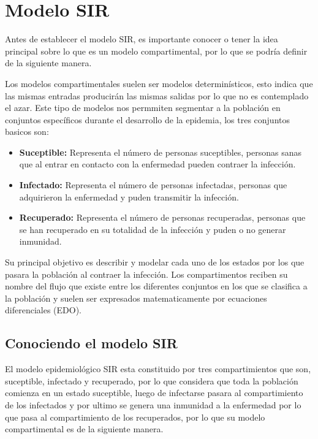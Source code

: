 \documentclass[a4paper,openany,12pt]{book}
\begin{document}
\chapter{Modelo SIR}

Antes de establecer el modelo SIR, es importante conocer o tener la idea principal sobre lo que es un modelo compartimental, por lo que se podría definir de la siguiente manera.

Los modelos compartimentales suelen ser modelos determinísticos, esto indica que las mismas entradas producirán las mismas salidas por lo que no es contemplado el azar. Este tipo de modelos nos permmiten segmentar a la población en conjuntos específicos durante el desarrollo de la epidemia, los tres conjuntos basicos son:

\begin{itemize}
\item \textbf{Suceptible:} Representa el número de personas suceptibles, personas sanas que al entrar en contacto con la enfermedad pueden contraer la infección.

\item \textbf{Infectado:} Representa el número de personas infectadas, personas que adquirieron la enfermedad y puden transmitir la infección.

\item \textbf{Recuperado:} Representa el número de personas recuperadas, personas que se han recuperado en su totalidad de la infección y puden o no generar inmunidad.
\end{itemize}

Su principal objetivo es describir y modelar cada uno de los estados por los que pasara la población al contraer la infección.
Los compartimentos reciben su nombre del flujo que existe entre los diferentes conjuntos en los que se clasifica a la población y suelen ser expresados matematicamente por ecuaciones diferenciales (EDO).

\section{Conociendo el modelo SIR}

El modelo epidemiológico SIR  esta constituido por tres compartimientos que son, suceptible, infectado y recuperado, por lo que considera que toda la población comienza en un estado suceptible, luego de infectarse pasara al compartimiento de los infectados y por ultimo se genera una inmunidad a la enfermedad por lo que pasa al compartimiento de los recuperados, por lo que su modelo compartimental es de la siguiente manera.
\end{document}
